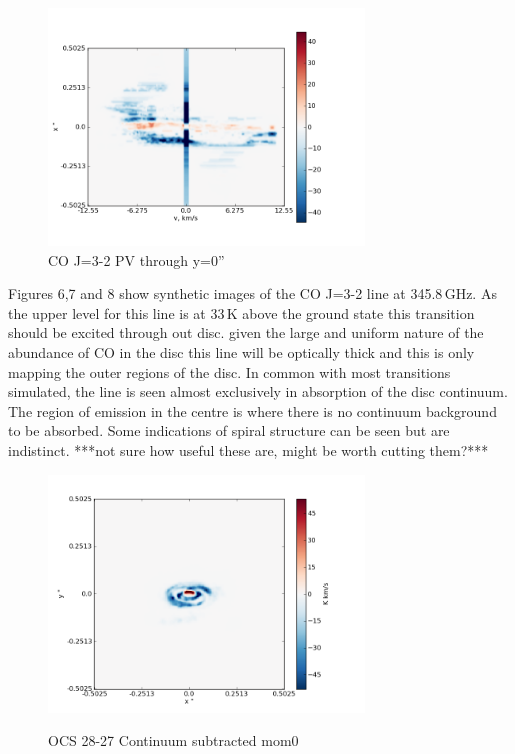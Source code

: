 \documentclass[useAMS,usenatbib]{mn2e}
\begin{document}
\begin{figure}[H]
 \includegraphics[width=84mm]{Figures/sim/imageCO_3-2_30deg_PV_centre.png}

 \caption{CO J=3-2 PV through y=0''}
\end{figure}

Figures 6,7 and 8 show synthetic images of the CO J=3-2 line at 345.8$\,$GHz. As the upper level for this line is at 33$\,$K above the ground state this transition should be excited through out disc. given the large and uniform nature of the abundance of CO in the disc this line will be optically thick and this is only mapping the outer regions of the disc. In common with most transitions simulated, the line is seen almost exclusively in absorption of the disc continuum. The region of emission in the centre is where there is no continuum background to be absorbed.  Some indications of spiral structure can be seen but are indistinct. ***not sure how useful these are, might be worth cutting them?***\newline



\begin{figure}[H]
 \includegraphics[width=84mm]{Figures/sim/imageOCS_28-27_30deg_composite_contSub.png}
 \label{OCS_mom0}
 \caption{OCS 28-27 Continuum subtracted mom0}
\end{figure}
\end{document}
